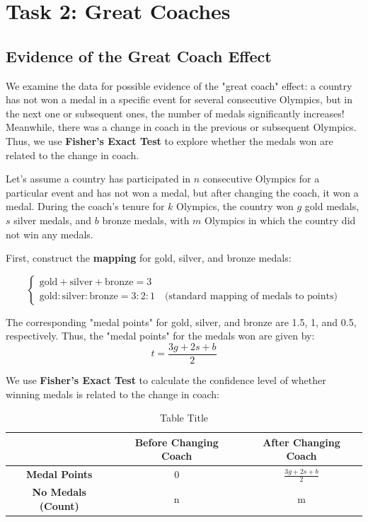 \documentclass{mcmthesis}  %
\begin{document}
\section{Task 2: Great Coaches}
\subsection{Evidence of the Great Coach Effect}

We examine the data for possible evidence of the "great coach" effect: a country has not won a medal in a specific event for several consecutive Olympics, but in the next one or subsequent ones, the number of medals significantly increases! Meanwhile, there was a change in coach in the previous or subsequent Olympics. Thus, we use \textbf{Fisher's Exact Test} to explore whether the medals won are related to the change in coach.

Let’s assume a country has participated in \(n\) consecutive Olympics for a particular event and has not won a medal, but after changing the coach, it won a medal. During the coach's tenure for \(k\) Olympics, the country won \(g\) gold medals, \(s\) silver medals, and \(b\) bronze medals, with \(m\) Olympics in which the country did not win any medals.

First, construct the \textbf{mapping} for gold, silver, and bronze medals:

\[
\begin{cases}
    \text{gold} + \text{silver} + \text{bronze} = 3 \\
    \text{gold} : \text{silver} : \text{bronze} = 3 : 2 : 1 \quad \text{(standard mapping of medals to points)}
\end{cases}
\]

The corresponding "medal points" for gold, silver, and bronze are 1.5, 1, and 0.5, respectively. Thus, the "medal points" for the medals won are given by:
$$ t = \frac{3g + 2s + b}{2} $$

We use \textbf{Fisher's Exact Test} to calculate the confidence level of whether winning medals is related to the change in coach:

\begin{table}[h]
\centering
\begin{tabular}{|c|c|c|}
\hline
\textbf & {Before Changing Coach} & \textbf{After Changing Coach} \\
\hline
\textbf{Medal Points} & 0 & $\displaystyle \frac{3g+2s+b}{2}$ \\
\hline
\textbf{No Medals (Count)} & n & m \\
\hline
\end{tabular}
\caption{Table Title}
\end{table}
\end{document}
